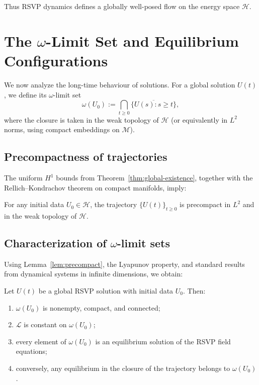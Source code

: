 Thus RSVP dynamics defines a globally well-posed flow on the energy space
$\mathcal{H}$.

\section{The $\omega$-Limit Set and Equilibrium Configurations}

We now analyze the long-time behaviour of solutions.  
For a global solution $U(t)$, we define its $\omega$-limit set
\[
\omega(U_0)
:= \bigcap_{t\ge 0} \overline{\{ U(s) : s\ge t \}},
\]
where the closure is taken in the weak topology of $\mathcal{H}$ (or
equivalently in $L^2$ norms, using compact embeddings on $\mathcal{M}$).

\subsection{Precompactness of trajectories}

The uniform $H^1$ bounds from Theorem~\ref{thm:global-existence}, together with
the Rellich--Kondrachov theorem on compact manifolds, imply:

\begin{lemma}
\label{lem:precompact}
For any initial data $U_0\in\mathcal{H}$, the trajectory
$\{U(t)\}_{t\ge 0}$ is precompact in $L^2$ and in the weak topology of
$\mathcal{H}$.
\end{lemma}

\subsection{Characterization of $\omega$-limit sets}

Using Lemma~\ref{lem:precompact}, the Lyapunov property, and standard results
from dynamical systems in infinite dimensions, we obtain:

\begin{theorem}
\label{thm:omega-limit}
Let $U(t)$ be a global RSVP solution with initial data $U_0$. Then:
\begin{enumerate}
  \item $\omega(U_0)$ is nonempty, compact, and connected;
  \item $\mathscr{L}$ is constant on $\omega(U_0)$;
  \item every element of $\omega(U_0)$ is an equilibrium solution of the RSVP
        field equations;
  \item conversely, any equilibrium in the closure of the trajectory belongs to
        $\omega(U_0)$.
\end{enumerate}
\end{theorem}

